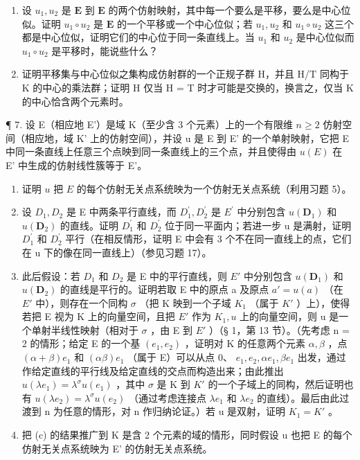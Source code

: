 \begin{enumerate}
\def\labelenumi{(\alph{enumi})}
\setcounter{enumi}{1}
\item
  设 \(u_1, u_2\) 是 \(\mathbf{E}\) 到 \(\mathbf{E}\) 的两个仿射映射，其中每一个要么是平移，要么是中心位似。证明 \(u_1 \circ u_2\) 是 \(\mathbf{E}\) 的一个平移或一个中心位似；若 \(u_1, u_2\) 和 \(u_1 \circ u_2\) 这三个都是中心位似，证明它们的中心位于同一条直线上。当 \(u_1\) 和 \(u_2\) 是中心位似而 \(u_1 \circ u_2\) 是平移时，能说些什么？
\item
  证明平移集与中心位似之集构成仿射群的一个正规子群 H，并且 H/T 同构于 K 的中心的乘法群；证明 H 仅当 H = T 时才可能是交换的，换言之，仅当 K 的中心恰含两个元素时。
\end{enumerate}

¶ 7. 设 E（相应地 E'）是域 K（至少含 3 个元素）上的一个有限维 \(n \geqslant 2\) 仿射空间（相应地，域 K' 上的仿射空间），并设 u 是 E 到 E' 的一个单射映射，它把 E 中同一条直线上任意三个点映到同一条直线上的三个点，并且使得由 \(u(E)\) 在 E' 中生成的仿射线性簇等于 E'。

\begin{enumerate}
\def\labelenumi{(\alph{enumi})}
\item
  证明 \(u\) 把 \(E\) 的每个仿射无关点系统映为一个仿射无关点系统（利用习题 5）。
\item
  设 \(D_{1}, D_{2}\) 是 E 中两条平行直线，而 \(D_{1}^{\prime}, D_{2}^{\prime}\) 是 \(E^{\prime}\) 中分别包含 \(u(\mathbf{D}_{1})\) 和 \(u(\mathbf{D}_{2})\) 的直线。证明 \(D_{1}^{\prime}\) 和 \(D_{2}^{\prime}\) 位于同一平面内；若进一步 u 是满射，证明 \(D_{1}^{\prime}\) 和 \(D_{2}^{\prime}\) 平行（在相反情形，证明 E 中会有 3 个不在同一直线上的点，它们在 u 下的像在同一直线上）（参见习题 17）。
\item
  此后假设：若 \(D_{1}\) 和 \(D_{2}\) 是 E 中的平行直线，则 \(E'\) 中分别包含 \(u(\mathbf{D}_{1})\) 和 \(u(\mathbf{D}_{2})\) 的直线是平行的。证明若取 E 中的原点 a 及原点 \(a' = u(a)\) （在 \(E'\) 中），则存在一个同构 \(\sigma\) （把 K 映到一个子域 \(K_{1}\) （属于 \(K'\) ）上），使得若把 E 视为 K 上的向量空间，且把 \(E'\) 作为 \(K_{1}, u\) 上的向量空间，则 u 是一个单射半线性映射（相对于 \(\sigma\) ，由 E 到 \(E'\) ）（§ 1，第 13 节）。（先考虑 n = 2 的情形；给定 E 的一个基 \((e_{1}, e_{2})\) ，证明对 K 的任意两个元素 \(\alpha, \beta\) ，点 \((\alpha + \beta)e_{1}\) 和 \((\alpha\beta)e_{1}\) （属于 E）可以从点 0、 \(e_{1}, e_{2}, \alpha e_{1}, \beta e_{1}\) 出发，通过作给定直线的平行线及给定直线的交点而构造出来；由此推出 \(u(\lambda e_{1}) = \lambda^{\sigma}u(e_{1})\) ，其中 \(\sigma\) 是 K 到 \(K'\) 的一个子域上的同构，然后证明也有 \(u(\lambda e_{2}) = \lambda^{\sigma}u(e_{2})\) （通过考虑连接点 \(\lambda e_{1}\) 和 \(\lambda e_{2}\) 的直线）。最后由此过渡到 n 为任意的情形，对 n 作归纳论证。）若 u 是双射，证明 \(K_{1} = K'\) 。
\item
  把 (c) 的结果推广到 K 是含 2 个元素的域的情形，同时假设 u 也把 E 的每个仿射无关点系统映为 E' 的仿射无关点系统。
\end{enumerate}

